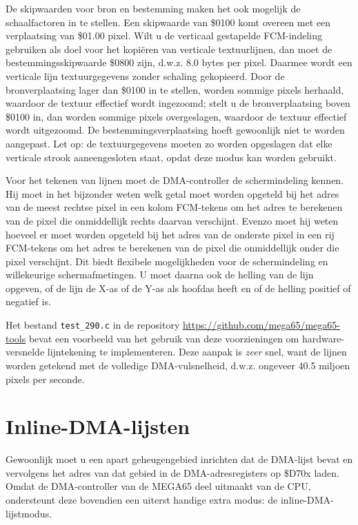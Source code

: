 De skipwaarden voor bron en bestemming maken het ook mogelijk de schaalfactoren in te stellen. Een skipwaarde van \$0100 komt overeen met een verplaatsing van \$01.00 pixel. Wilt u de verticaal gestapelde FCM-indeling gebruiken als doel voor het kopiëren van verticale textuurlijnen, dan moet de bestemmingsskipwaarde \$0800 zijn, d.w.z. 8.0 bytes per pixel. Daarmee wordt een verticale lijn textuurgegevens zonder schaling gekopieerd. Door de bronverplaatsing lager dan \$0100 in te stellen, worden sommige pixels herhaald, waardoor de textuur effectief wordt ingezoomd; stelt u de bronverplaatsing boven \$0100 in, dan worden sommige pixels overgeslagen, waardoor de textuur effectief wordt uitgezoomd. De bestemmingsverplaatsing hoeft gewoonlijk niet te worden aangepast. Let op: de textuurgegevens moeten zo worden opgeslagen dat elke verticale strook aaneengesloten staat, opdat deze modus kan worden gebruikt.

Voor het tekenen van lijnen moet de DMA-controller de schermindeling kennen. Hij moet in het bijzonder weten welk getal moet worden opgeteld bij het adres van de meest rechtse pixel in een kolom FCM-tekens om het adres te berekenen van de pixel die onmiddellijk rechts daarvan verschijnt. Evenzo moet hij weten hoeveel er moet worden opgeteld bij het adres van de onderste pixel in een rij FCM-tekens om het adres te berekenen van de pixel die onmiddellijk onder die pixel verschijnt. Dit biedt flexibele mogelijkheden voor de schermindeling en willekeurige schermafmetingen. U moet daarna ook de helling van de lijn opgeven, of de lijn de X-as of de Y-as als hoofdas heeft en of de helling positief of negatief is.

Het bestand {\tt test\_290.c} in de repository \url{https://github.com/mega65/mega65-tools} bevat een voorbeeld van het gebruik van deze voorzieningen om hardware-versnelde lijntekening te implementeren. Deze aanpak is {\em zeer} snel, want de lijnen worden getekend met de volledige DMA-vulsnelheid, d.w.z. ongeveer 40.5 miljoen pixels per seconde.

\section{Inline-DMA-lijsten}

Gewoonlijk moet u een apart geheugengebied inrichten dat de DMA-lijst bevat en vervolgens het adres van dat gebied in de DMA-adresregisters op \$D70x laden. Omdat de DMA-controller van de MEGA65 deel uitmaakt van de CPU, ondersteunt deze bovendien een uiterst handige extra modus: de inline-DMA-lijstmodus.

